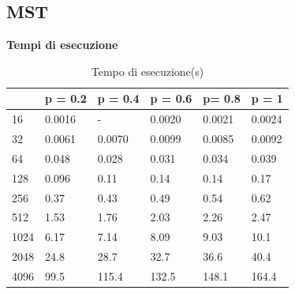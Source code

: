 \documentclass[]{article}
\begin{document}
\subsection{MST}
\textbf{Tempi di esecuzione}
\begin{table}[H]
\centering
\caption{Tempo di esecuzione(s)}
\label{tab:mst_time}
\begin{tabular}{|l|l|l|l|l|l|} 
\cline{2-6}
\multicolumn{1}{l|}{} & p = 0.2 & p = 0.4 & p = 0.6 & p= 0.8 & p = 1   \\ 
\hline
16                    & 0.0016  & -       & 0.0020  & 0.0021 & 0.0024  \\
32                    & 0.0061  & 0.0070  & 0.0099  & 0.0085 & 0.0092  \\
64                    & 0.048   & 0.028   & 0.031   & 0.034  & 0.039   \\
128                   & 0.096   & 0.11    & 0.14    & 0.14   & 0.17    \\
256                   & 0.37    & 0.43    & 0.49    & 0.54   & 0.62    \\
512                   & 1.53    & 1.76    & 2.03    & 2.26   & 2.47    \\
1024                  & 6.17    & 7.14    & 8.09    & 9.03   & 10.1    \\
2048                  & 24.8    & 28.7    & 32.7    & 36.6   & 40.4    \\
4096                  & 99.5    & 115.4   & 132.5   & 148.1  & 164.4   \\
\hline
\end{tabular}
\end{table}
\end{document}

